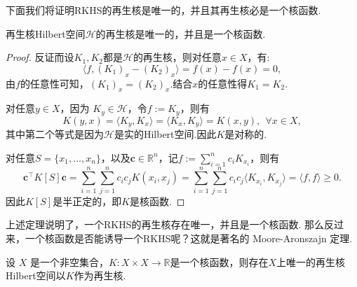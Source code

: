 \documentclass[../master.tex]{subfiles}
\begin{document}
下面我们将证明RKHS的再生核是唯一的，并且其再生核必是一个核函数.
\begin{theorem}[RKHS决定再生核]
    再生核Hilbert空间$\mathcal{H}$的再生核是唯一的，并且是一个核函数.
\end{theorem}

\begin{proof}
    反证而设$K_1,K_2$都是$\mathcal{H}$的再生核，则对任意$x\in X$，有:
    \begin{equation*}
        \langle f,(K_1)_x-(K_2)_x\rangle=f(x)-f(x)=0,
    \end{equation*}
    由$f$的任意性可知，$(K_1)_x=(K_2)_x$.结合$x$的任意性得$K_1=K_2$.

    对任意$y\in X$，因为 $K_y\in\mathcal{H}$，令$f:=K_y$，则有
    \begin{equation*}
        K(y,x)=\langle K_y,K_x\rangle=\langle K_x,K_y\rangle=K(x,y),~~\forall x\in X,
    \end{equation*}
    其中第二个等式是因为$\mathcal{H}$是实的Hilbert空间.因此$K$是对称的.

    对任意$S=\{x_1,\dots,x_n\}$，以及$\boldsymbol{c}\in\mathbb{R}^n$，记$f:=\sum_{i=1}^n c_i K_{x_i}$，则有
    \begin{equation*}
        \boldsymbol{c}^\top K[S]\boldsymbol{c}=\sum_{i=1}^n\sum_{j=1}^nc_ic_jK(x_i,x_j)=\sum_{i=1}^n\sum_{j=1}^nc_ic_j\langle K_{x_i},K_{x_j}\rangle = \langle f,f\rangle\geq 0.
    \end{equation*}
    因此$K[S]$是半正定的，即$K$是核函数.
\end{proof}

上述定理说明了，一个RKHS的再生核存在唯一，并且是一个核函数. 那么反过来，一个核函数是否能诱导一个RKHS呢？这就是著名的 Moore-Aronszajn 定理.

\begin{theorem}\label{thm:Moore-Aronszajn}
    设 $X$ 是一个非空集合，$K:X\times X\to \mathbb{R}$是一个核函数，则存在$X$上唯一的再生核Hilbert空间以$K$作为再生核.
\end{theorem}
\end{document}
